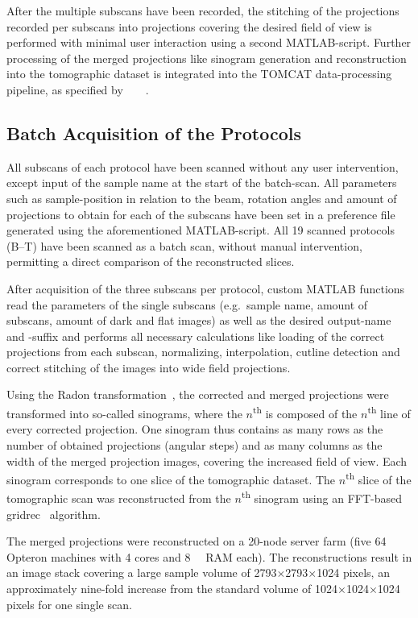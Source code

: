 After the multiple subscans have been recorded, the stitching of the projections recorded per subscans into projections covering the desired field of view is performed with minimal user interaction using a second MATLAB-script. Further processing of the merged projections like sinogram generation and reconstruction into the tomographic dataset is integrated into the TOMCAT data-processing pipeline, as specified by%
\ifhtml%
	~\citet{Hintermueller2009}%
\else%
	~%
\fi%
.

\subsection{Batch Acquisition of the Protocols}%
All subscans of each protocol have been scanned without any user intervention, except input of the sample name at the start of the batch-scan. All parameters such as sample-position in relation to the beam, rotation angles and amount of projections to obtain for each of the subscans have been set in a preference file generated using the aforementioned MATLAB-script. All 19 scanned protocols (B--T) have been scanned as a batch scan, without manual intervention, permitting a direct comparison of the reconstructed slices.

After acquisition of the three subscans per protocol, custom MATLAB functions read the parameters of the single subscans (e.g.\ sample name, amount of subscans, amount of dark and flat images) as well as the desired output-name and -suffix and performs all necessary calculations like loading of the correct projections from each subscan, normalizing, interpolation, cutline detection and correct stitching of the images into wide field projections.

Using the Radon transformation~\cite{Radon1917}, the corrected and merged projections were transformed into so-called sinograms, where the $n$\textsuperscript{th} is composed of the $n$\textsuperscript{th} line of every corrected projection. One sinogram thus contains as many rows as the number of obtained projections (angular steps) and as many columns as the width of the merged projection images, covering the increased field of view. Each sinogram corresponds to one slice of the tomographic dataset. The $n$\textsuperscript{th} slice of the tomographic scan was reconstructed from the $n$\textsuperscript{th} sinogram using an FFT-based gridrec~\cite{Dowd1999} algorithm.

The merged projections were reconstructed on a 20-node server farm (five \SI{64}{\bit} Opteron machines with 4 cores and \SI{8}{\giga\byte} RAM each). The reconstructions result in an image stack covering a large sample volume of 2793$\times$2793$\times$1024 pixels, an approximately nine-fold increase from the standard volume of 1024$\times$1024$\times$1024 pixels for one single scan.